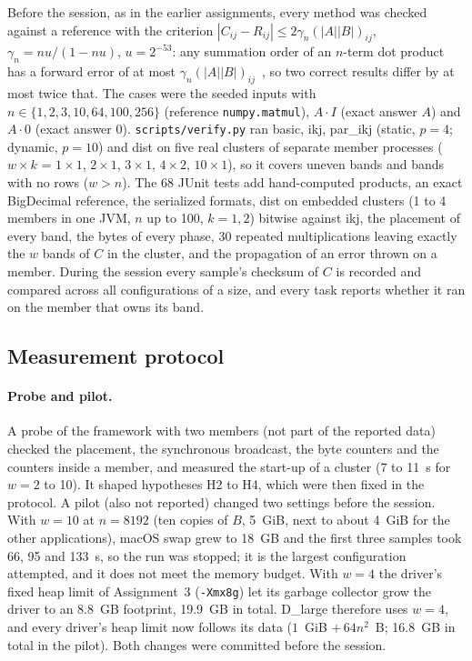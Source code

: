 \documentclass[11pt,a4paper]{article}
\begin{document}
Before the session, as in the earlier assignments, every method was checked
against a reference with the criterion
$|C_{ij}-R_{ij}|\le 2\gamma_n(|A||B|)_{ij}$, $\gamma_n=nu/(1-nu)$, $u=2^{-53}$:
any summation order of an $n$-term dot product has a forward error of at most
$\gamma_n(|A||B|)_{ij}$~\cite[Secs.~3.1, 3.5]{higham2002}, so two correct results
differ by at most twice that. The cases were the seeded inputs with
$n\in\{1,2,3,10,64,100,256\}$ (reference \texttt{numpy.matmul}), $A\cdot I$
(exact answer $A$) and $A\cdot0$ (exact answer 0). \texttt{scripts/verify.py}
ran basic, ikj, par\_ikj (static, $p=4$; dynamic, $p=10$) and dist on five real
clusters of separate member processes ($w\times k$ = $1\times1$, $2\times1$,
$3\times1$, $4\times2$, $10\times1$), so it covers uneven bands and bands with
no rows ($w>n$). The 68 JUnit tests add hand-computed products, an exact
BigDecimal reference, the serialized formats, dist on embedded clusters
(1 to 4 members in one JVM, $n$ up to 100, $k=1,2$) bitwise against ikj, the
placement of every band, the bytes of every phase, 30 repeated multiplications
leaving exactly the $w$ bands of $C$ in the cluster, and the propagation of an
error thrown on a member. During the session every sample's checksum of $C$ is
recorded and compared across all configurations of a size, and every task
reports whether it ran on the member that owns its band.

\subsection{Measurement protocol}
\label{sec:protocol}

\paragraph{Probe and pilot.} A probe of the framework with two members
(not part of the reported data) checked the placement, the synchronous
broadcast, the byte counters and the counters inside a member, and measured the
start-up of a cluster (7 to 11~s for $w=2$ to 10). It shaped hypotheses H2 to
H4, which were then fixed in the protocol. A pilot (also not reported) changed
two settings before the session. With $w=10$ at $n=8192$ (ten copies of $B$,
5~GiB, next to about 4~GiB for the other applications), macOS swap grew to
18~GB and the first three samples took 66, 95 and 133~s, so the run was
stopped; it is the largest configuration attempted, and it does not meet the
memory budget. With $w=4$ the driver's fixed heap limit of Assignment~3
(\texttt{-Xmx8g}) let its garbage collector grow the driver to an 8.8~GB
footprint, 19.9~GB in total. D\_large therefore uses $w=4$, and every driver's
heap limit now follows its data ($1$~GiB $+\,64n^2$~B; 16.8~GB in total in the
pilot). Both changes were committed before the session.
\end{document}
